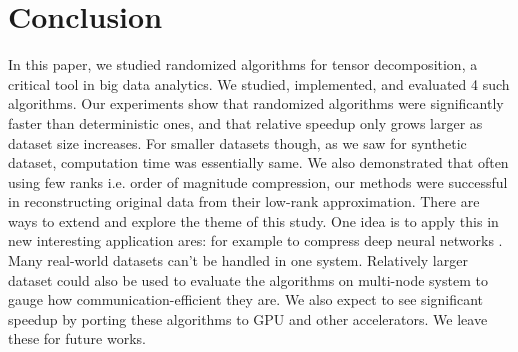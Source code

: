 \documentclass[preprint]{elsarticle}
\begin{document}
\section{Conclusion}
\noindent In this paper, we studied randomized algorithms for tensor decomposition, a critical tool in big data
analytics. We studied, implemented, and evaluated 4 such algorithms. 
\vskip0.3cm
\noindent Our experiments show that randomized algorithms were significantly faster than deterministic ones, and
that relative speedup only grows larger as dataset size increases. For smaller datasets though, as we saw for synthetic
dataset, computation time was essentially same. We also demonstrated that often using few ranks i.e. order of magnitude
compression, our methods were successful in reconstructing original data from their low-rank approximation.
\vskip0.3cm
\noindent There are ways to extend and explore the theme of this study. One idea is to apply this in new interesting
application ares: for example to compress deep neural networks \cite{bacciu2020tensor}. Many real-world datasets can't
be handled in one system. Relatively larger dataset could also be used to evaluate the algorithms on multi-node system
to gauge how communication-efficient they are. We also expect to see significant speedup by  porting these algorithms
to GPU and other accelerators. We leave these for future works.



\end{document}
